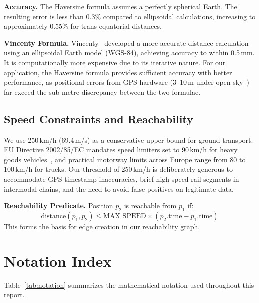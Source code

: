 \textbf{Accuracy.} The Haversine formula assumes a perfectly spherical Earth. The resulting error is less than 0.3\% compared to ellipsoidal calculations, increasing to approximately 0.55\% for trans-equatorial distances.

\textbf{Vincenty Formula.} Vincenty~\cite{vincenty1975direct} developed a more accurate distance calculation using an ellipsoidal Earth model (WGS-84), achieving accuracy to within 0.5\,mm. It is computationally more expensive due to its iterative nature. For our application, the Haversine formula provides sufficient accuracy with better performance, as positional errors from GPS hardware (3--10\,m under open sky~\cite{kuras2024assessment}) far exceed the sub-metre discrepancy between the two formulae.

\subsection{Speed Constraints and Reachability}
We use 250\,km/h (69.4\,m/s) as a conservative upper bound for ground transport. EU Directive 2002/85/EC mandates speed limiters set to 90\,km/h for heavy goods vehicles~\cite{eurlex2002speedlimiter}, and practical motorway limits across Europe range from 80 to 100\,km/h for trucks. Our threshold of 250\,km/h is deliberately generous to accommodate GPS timestamp inaccuracies, brief high-speed rail segments in intermodal chains, and the need to avoid false positives on legitimate data.

\textbf{Reachability Predicate.} Position $p_2$ is reachable from $p_1$ if:
\[
\text{distance}(p_1, p_2) \leq \text{MAX\_SPEED} \times (p_2.\text{time} - p_1.\text{time})
\]
This forms the basis for edge creation in our reachability graph.

\section{Notation Index}

Table~\ref{tab:notation} summarizes the mathematical notation used throughout this report.

